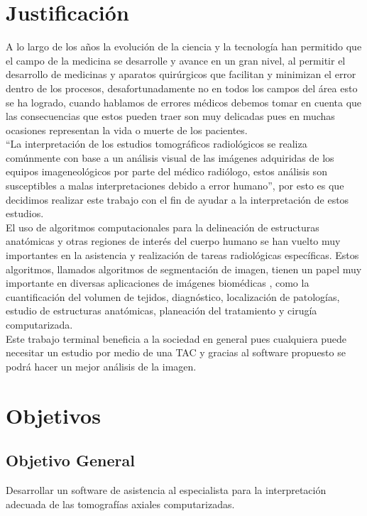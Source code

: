 \documentclass[12pt]{report}
\begin{document}
\section{Justificación}
A lo largo de los años la evolución de la ciencia y la tecnología han permitido que el campo de la medicina se desarrolle y avance en un gran nivel, al permitir el desarrollo de medicinas y aparatos quirúrgicos que facilitan y minimizan el error dentro de los procesos, desafortunadamente no en todos los campos del área esto se ha logrado, cuando hablamos de errores médicos debemos tomar en cuenta que las consecuencias que estos pueden traer son muy delicadas pues en muchas ocasiones representan la vida o muerte de los pacientes.\\ 

“La interpretación de los estudios tomográficos radiológicos se realiza comúnmente con base a un análisis visual de las imágenes adquiridas de los equipos imageneológicos por parte del médico radiólogo, estos análisis son susceptibles a malas interpretaciones debido a error humano”, por esto es que decidimos realizar este trabajo con el fin de ayudar a la interpretación de estos estudios.\\

El uso de algoritmos computacionales para la delineación de estructuras anatómicas y otras regiones de interés del cuerpo humano se han vuelto muy importantes en la asistencia y realización de tareas radiológicas específicas. Estos algoritmos, llamados algoritmos de segmentación de imagen, tienen un papel muy importante en diversas aplicaciones de imágenes biomédicas , como la cuantificación del volumen de tejidos, diagnóstico, localización de patologías, estudio de estructuras anatómicas, planeación del tratamiento y cirugía computarizada.\cite{metodos}\\ 

Este trabajo terminal beneficia a la sociedad en general pues cualquiera puede necesitar un estudio por medio de una TAC y gracias al software propuesto se  podrá hacer un mejor análisis de la imagen.

\section{Objetivos}
\subsection{Objetivo General}
Desarrollar un software de asistencia al especialista para la interpretación adecuada de las tomografías axiales computarizadas.
\end{document}
